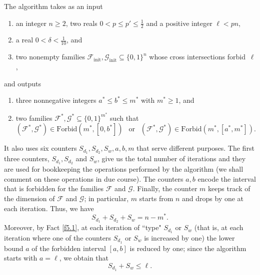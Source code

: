\documentclass[10pt,a4paper]{amsart}
\theoremstyle{remark}
\newcommand{\meg}{\geqslant}
\newcommand{\mik}{\leqslant}
\newcommand{\Fcal}{\mathcal{F}}
\newcommand{\Gcal}{\mathcal{G}}
\newcommand{\Forb}[2]{\mathrm{Forbid}\left(#1,#2\right)}
\begin{document}
The algorithm takes as an input
\begin{enumerate}
\item[(I1)] an integer $n\meg 2$, two reals $0<p\mik p'\mik \frac12$ and a positive integer $\ell< pn$,
\item[(I2)] a real $0<\delta<\frac{1}{10}$, and
\item[(I3)] two nonempty families $\Fcal_{\mathrm{init}}, \Gcal_{\mathrm{init}}\subseteq \{0,1\}^n$ whose
cross intersections forbid~$\ell$,
\end{enumerate}
and outputs
\begin{enumerate}
\item[(O1)] three nonnegative integers $a^*\mik b^*\mik m^*$ with $m^*\meg 1$, and
\item[(O2)] two families $\Fcal^*, \Gcal^*\subseteq \{0,1\}^{m^*}$ such that
\begin{equation} \label{e5.4}
(\Fcal^*,\Gcal^*)\in\Forb{m^*}{[0,b^*]} \ \  \text{ or } \ \
(\Fcal^*,\Gcal^*)\in \Forb{m^*}{[a^*,m^*]}.
\end{equation}
\end{enumerate}
It also uses six counters $S_{d_1},S_{d_2},S_w,a,b,m$ that serve different purposes.
The first three counters, $S_{d_1},S_{d_2}$ and $S_w$, give us the total number of iterations
and they are used for bookkeeping the operations performed by the algorithm (we shall comment
on these operations in due course). The counters $a,b$ encode the interval that is forbidden
for the families $\Fcal$ and $\Gcal$. Finally, the counter $m$ keeps track of the dimension of
$\Fcal$ and $\Gcal$; in particular, $m$ starts from $n$ and drops by one at each iteration. Thus, we have
\begin{equation}\label{e5.5}
S_{d_1}+S_{d_2}+S_w=n-m^*.
\end{equation}
Moreover, by Fact \ref{f5.1}, at each iteration of ``type" $S_{d_1}$ or $S_{w}$
(that is, at each iteration where one of the counters $S_{d_1}$ or $S_{w}$ is increased by one)
the lower bound $a$ of the forbidden interval $[a,b]$ is reduced by one; since the algorithm starts
with $a=\ell$, we obtain that
\begin{equation} \label{e5.6}
S_{d_1}+S_w\mik \ell.
\end{equation}
\end{document}
